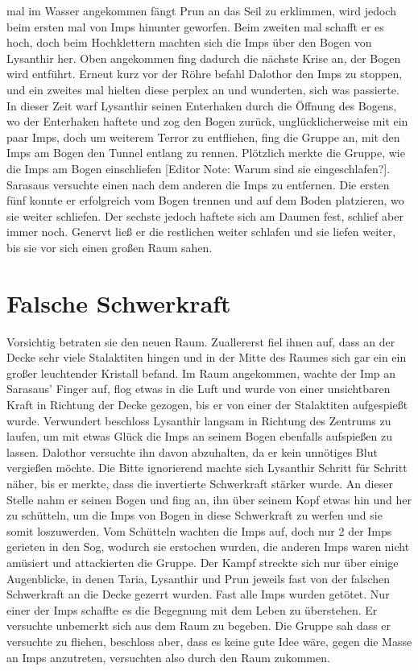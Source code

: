 \documentclass[10pt,twoside,twocolumn,openany]{book}
\begin{document}
mal im Wasser angekommen fängt Prun an das Seil zu erklimmen, wird jedoch beim ersten mal von Imps hinunter geworfen. Beim zweiten mal schafft er es hoch, doch beim Hochklettern machten sich die Imps über den Bogen von Lysanthir her. Oben angekommen fing dadurch die nächste Krise an, der Bogen wird entführt. Erneut kurz vor der Röhre befahl Dalothor den Imps zu stoppen, und ein zweites mal hielten diese perplex an und wunderten, sich was passierte. In dieser Zeit warf Lysanthir seinen Enterhaken durch die Öffnung des Bogens, wo der Enterhaken haftete und zog den Bogen zurück, unglücklicherweise mit ein paar Imps, doch um weiterem Terror zu entfliehen, fing die Gruppe an, mit den Imps am Bogen den Tunnel entlang zu rennen. Plötzlich merkte die Gruppe, wie die Imps am Bogen einschliefen [Editor Note: Warum sind sie eingeschlafen?]. Sarasaus versuchte einen nach dem anderen die Imps zu entfernen. Die ersten fünf konnte er erfolgreich vom Bogen trennen und auf dem Boden platzieren, wo sie weiter schliefen. Der sechste jedoch haftete sich am Daumen fest, schlief aber immer noch. Genervt ließ er die restlichen weiter schlafen und sie liefen weiter, bis sie vor sich einen großen Raum sahen.
	
	\section{Falsche Schwerkraft}
	
	Vorsichtig betraten sie den neuen Raum. Zuallererst fiel ihnen auf, dass an der Decke sehr viele Stalaktiten hingen und in der Mitte des Raumes sich gar ein ein großer leuchtender Kristall befand. Im Raum angekommen, wachte der Imp an Sarasaus' Finger auf, flog etwas in die Luft und wurde von einer unsichtbaren Kraft in Richtung der Decke gezogen, bis er von einer der Stalaktiten aufgespießt wurde. Verwundert beschloss Lysanthir langsam in Richtung des Zentrums zu laufen, um mit etwas Glück die Imps an seinem Bogen ebenfalls aufspießen zu lassen. Dalothor versuchte ihn davon abzuhalten, da er kein unnötiges Blut vergießen möchte. Die Bitte ignorierend machte sich Lysanthir Schritt für Schritt näher, bis er merkte, dass die invertierte Schwerkraft stärker wurde. An dieser Stelle nahm er seinen Bogen und fing an, ihn über seinem Kopf etwas hin und her zu schütteln, um die Imps von Bogen in diese Schwerkraft zu werfen und sie somit loszuwerden. Vom Schütteln wachten die Imps auf, doch nur 2 der Imps gerieten in den Sog, wodurch sie erstochen wurden, die anderen Imps waren nicht amüsiert und attackierten die Gruppe. Der Kampf streckte sich nur über einige Augenblicke, in denen Taria, Lysanthir und Prun jeweils fast von der falschen Schwerkraft an die Decke gezerrt wurden. Fast alle Imps wurden getötet. Nur einer der Imps schaffte es die Begegnung mit dem Leben zu überstehen. Er versuchte unbemerkt sich aus dem Raum zu begeben. Die Gruppe sah dass er versuchte zu fliehen, beschloss aber, dass es keine gute Idee wäre, gegen die Masse an Imps anzutreten, versuchten also durch den Raum zukommen. 
	
\end{document}
